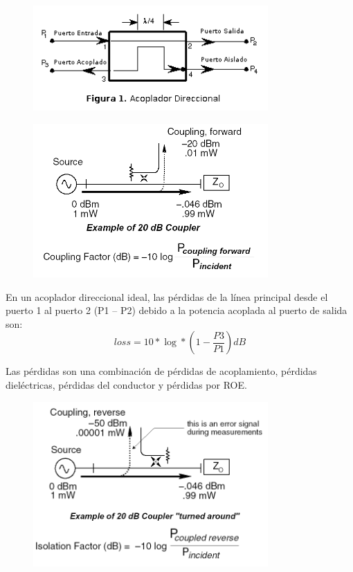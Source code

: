 \documentclass[a4paper,12pt,twoside]{article}
\begin{document}
\begin{figure}[H]
    \centering
    \includegraphics[width=0.8\textwidth]{../img/acople_direccional.png}
\end{figure}

\begin{figure}[H]
    \centering
    \includegraphics[width=0.8\textwidth]{../img/acople_direccional2.png}
\end{figure}

En un acoplador direccional ideal, las pérdidas de la línea principal desde el puerto 1 al puerto 2 (P1 – P2) debido a la potencia acoplada al puerto de salida son:
\begin{equation*}
loss = 10*\log*(1-\frac{P3}{P1})dB
\end{equation*}

Las pérdidas son una combinación de pérdidas de acoplamiento, pérdidas dieléctricas,
pérdidas del conductor y pérdidas por ROE.

\begin{figure}[H]
    \centering
    \includegraphics[width=0.8\textwidth]{../img/acople_direccional3.png}
\end{figure}
\end{document}
